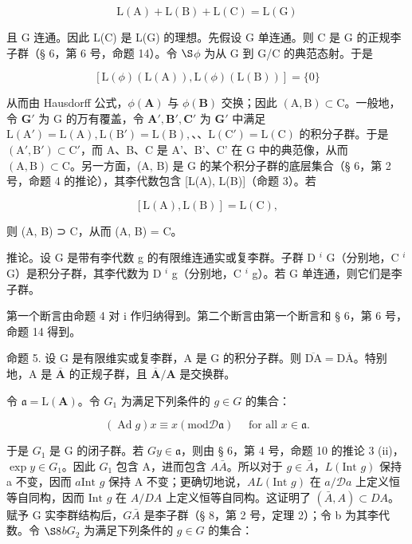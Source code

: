 \[
\mathrm{L} (\mathrm{A}) + \mathrm{L} (\mathrm{B}) + \mathrm{L} (\mathrm{C}) = \mathrm{L} (\mathrm{G})
\]

且 G 连通。因此 L(C) 是 L(G) 的理想。先假设 G 单连通。则 C 是 G 的正规李子群（§ 6，第 6 号，命题 14）。令 \(\S\)\(\phi\) 为从 G 到 G/C 的典范态射。于是

\[
[ \mathrm{L} (\phi) (\mathrm{L} (\mathrm{A})), \mathrm{L} (\phi) (\mathrm{L} (\mathrm{B})) ] = \{0 \}
\]

从而由 Hausdorff 公式，\(\phi (\mathbf{A})\) 与 \(\phi (\mathbf{B})\) 交换；因此 \((\mathrm{A},\mathrm{B})\subset \mathrm{C}\)。一般地，令 \(\mathbf{G}'\) 为 G 的万有覆盖，令 \(\mathbf{A}',\mathbf{B}',\mathbf{C}'\) 为 \(\mathbf{G}'\) 中满足 \(\mathrm{L}(\mathrm{A}') = \mathrm{L}(\mathrm{A}),\mathrm{L}(\mathrm{B}') = \mathrm{L}(\mathrm{B}),\)、、\(\mathrm{L}(\mathrm{C}') = \mathrm{L}(\mathrm{C})\) 的积分子群。于是 \((\mathrm{A}',\mathrm{B}')\subset \mathrm{C}'\)，而 A、B、C 是 A'、B'、C' 在 G 中的典范像，从而 \((\mathrm{A},\mathrm{B})\subset \mathrm{C}\)。另一方面，(A, B) 是 G 的某个积分子群的底层集合（§ 6，第 2 号，命题 4 的推论），其李代数包含 [L(A), L(B)]（命题 3）。若

\[
[ \mathrm{L} (\mathrm{A}), \mathrm{L} (\mathrm{B}) ] = \mathrm{L} (\mathrm{C}),
\]

则 (A, B) ⊃ C，从而 (A, B) = C。

推论。设 G 是带有李代数 g 的有限维连通实或复李群。子群 D \(^{i}\) G（分别地，C \(^{i}\) G）是积分子群，其李代数为 D \(^{i}\) g（分别地，C \(^{i}\) g）。若 G 单连通，则它们是李子群。

第一个断言由命题 4 对 i 作归纳得到。第二个断言由第一个断言和 § 6，第 6 号，命题 14 得到。

命题 5. 设 G 是有限维实或复李群，A 是 G 的积分子群。则 \(\overline{\mathrm{D}\mathrm{A}} = \mathrm{D}\overline{\mathrm{A}}\)。特别地，A 是 \(\overline{\mathbf{A}}\) 的正规子群，且 \(\overline{\mathbf{A}} / \mathbf{A}\) 是交换群。

令 \(\mathfrak{a} = \mathrm{L}(\mathbf{A})\)。令 \(G_{1}\) 为满足下列条件的 \(g \in G\) 的集合：

\[
(\operatorname{Ad} g) x \equiv x (\mathrm{mod} \mathscr {D} \mathfrak {a}) \quad \text { for   all } x \in \mathfrak {a}.
\]

于是 \(G_1\) 是 G 的闭子群。若 \(G\)\(y \in \mathfrak{a}\)，则由 § 6，第 4 号，命题 10 的推论 3 (ii)，\(\exp y \in G_1\)。因此 \(G_1\) 包含 A，进而包含 \(A\)\(\bar{A}\)。所以对于 \(g \in \bar{A}\)，\(L(\text{Int } g)\) 保持 a 不变，因而 \(a\)\(\text{Int } g\) 保持 A 不变；更确切地说，\(A\)\(L(\text{Int } g)\) 在 \(a / \mathcal{D}a\) 上定义恒等自同构，因而 \(\text{Int } g\) 在 \(A / DA\) 上定义恒等自同构。这证明了 \((\bar{A}, A) \subset DA\)。赋予 G 实李群结构后，\(G\)\(\bar{A}\) 是李子群（§ 8，第 2 号，定理 2）；令 b 为其李代数。令 \(\S 8\)\(b\)\(G_2\) 为满足下列条件的 \(g \in G\) 的集合：

